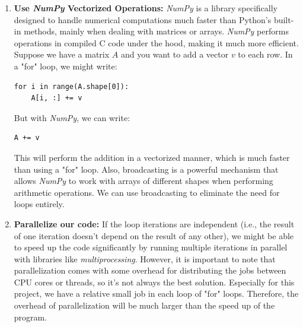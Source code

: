\documentclass{article}
\begin{document}
\begin{enumerate}
\item \textbf{Use \textit{NumPy} Vectorized Operations:} \textit{NumPy} is a library specifically designed to handle numerical computations much faster than Python's built-in methods, mainly when dealing with matrices or arrays. \textit{NumPy} performs operations in compiled C code under the hood, making it much more efficient. Suppose we have a matrix $A$ and you want to add a vector $v$ to each row. In a "for" loop, we might write:
\begin{verbatim}
for i in range(A.shape[0]):
    A[i, :] += v
\end{verbatim}
But with \textit{NumPy}, we can write:
\begin{verbatim}
A += v
\end{verbatim}
This will perform the addition in a vectorized manner, which is much faster than using a "for" loop. 
Also, broadcasting is a powerful mechanism that allows \textit{NumPy} to work with arrays of different shapes when performing arithmetic operations. We can use broadcasting to eliminate the need for loops entirely.

\item \textbf{Parallelize our code:} If the loop iterations are independent (i.e., the result of one iteration doesn't depend on the result of any other), we might be able to speed up the code significantly by running multiple iterations in parallel with libraries like \textit{multiprocessing}. 
However, it is important to note that parallelization comes with some overhead for distributing the jobs between CPU cores or threads, so it's not always the best solution. 
Especially for this project, we have a relative small job in each loop of "for" loops. Therefore, the overhead of parallelization will be much larger than the speed up of the program.

\end{enumerate}
\end{document}
